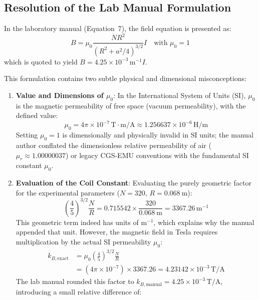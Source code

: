 \documentclass[journal]{IEEEtran}
\begin{document}
\subsection{Resolution of the Lab Manual Formulation}
In the laboratory manual (Equation~7), the field equation is presented as:
\begin{equation}
    B = \mu_0 \frac{N R^2}{\left(R^2 + a^2/4\right)^{3/2}} I \quad \text{with } \mu_0 = 1
    \label{eq:manual_formula}
\end{equation}
which is quoted to yield $B = 4.25 \times 10^{-3}\,\mathrm{m^{-1}} I$. 

This formulation contains two subtle physical and dimensional misconceptions:
\begin{enumerate}
    \item \textbf{Value and Dimensions of $\mu_0$}: In the International System of Units (SI), $\mu_0$ is the magnetic permeability of free space (vacuum permeability), with the defined value:
    \begin{equation}
        \mu_0 = 4\pi \times 10^{-7}\,\mathrm{T \cdot m / A} \approx 1.256637 \times 10^{-6}\,\mathrm{H/m}
    \end{equation}
    Setting $\mu_0 = 1$ is dimensionally and physically invalid in SI units; the manual author conflated the dimensionless relative permeability of air ($\mu_r \approx 1.00000037$) or legacy CGS-EMU conventions with the fundamental SI constant $\mu_0$.
    \item \textbf{Evaluation of the Coil Constant}: Evaluating the purely geometric factor for the experimental parameters ($N = 320$, $R = \SI{0.068}{\meter}$):
    \begin{equation}
        \left(\frac{4}{5}\right)^{3/2} \frac{N}{R} = 0.715542 \times \frac{320}{\SI{0.068}{\meter}} = 3367.26\,\mathrm{m^{-1}}
    \end{equation}
    This geometric term indeed has units of $\mathrm{m^{-1}}$, which explains why the manual appended that unit. However, the magnetic field in Tesla requires multiplication by the actual SI permeability $\mu_0$:
    \begin{align}
        k_{B,\text{exact}} &= \mu_0 \left(\frac{4}{5}\right)^{3/2} \frac{N}{R} \nonumber \\
        &= (4\pi \times 10^{-7}) \times 3367.26 = 4.23142 \times 10^{-3}\,\mathrm{T/A}
        \label{eq:kB_exact}
    \end{align}
    The lab manual rounded this factor to $k_{B,\text{manual}} = 4.25 \times 10^{-3}\,\mathrm{T/A}$, introducing a small relative difference of:

\end{enumerate}
\end{document}
